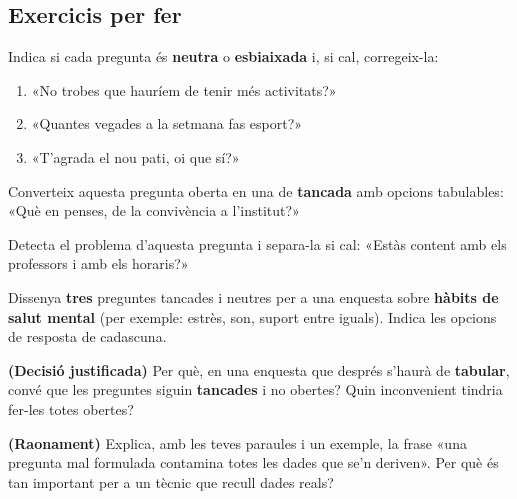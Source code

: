 \subsection{Exercicis per fer}

\begin{exercicis}
\begin{exlist}
  \item Indica si cada pregunta és \textbf{neutra} o \textbf{esbiaixada} i, si cal,
        corregeix-la:
    \begin{enumerate}[label=\alph*), leftmargin=1.6em, topsep=2pt]
      \item «No trobes que hauríem de tenir més activitats?»
      \item «Quantes vegades a la setmana fas esport?»
      \item «T'agrada el nou pati, oi que sí?»
    \end{enumerate}
  \item Converteix aquesta pregunta oberta en una de \textbf{tancada} amb opcions
        tabulables: «Què en penses, de la convivència a l'institut?»
  \item Detecta el problema d'aquesta pregunta i separa-la si cal: «Estàs content amb
        els professors i amb els horaris?»
  \item Dissenya \textbf{tres} preguntes tancades i neutres per a una enquesta sobre
        \textbf{hàbits de salut mental} (per exemple: estrès, son, suport entre
        iguals). Indica les opcions de resposta de cadascuna.
  \item \textbf{(Decisió justificada)} Per què, en una enquesta que després s'haurà de
        \textbf{tabular}, convé que les preguntes siguin \textbf{tancades} i no obertes?
        Quin inconvenient tindria fer-les totes obertes?
  \item \textbf{(Raonament)} Explica, amb les teves paraules i un exemple, la frase
        «una pregunta mal formulada contamina totes les dades que se'n deriven». Per
        què és tan important per a un tècnic que recull dades reals?
\end{exlist}
\end{exercicis}

